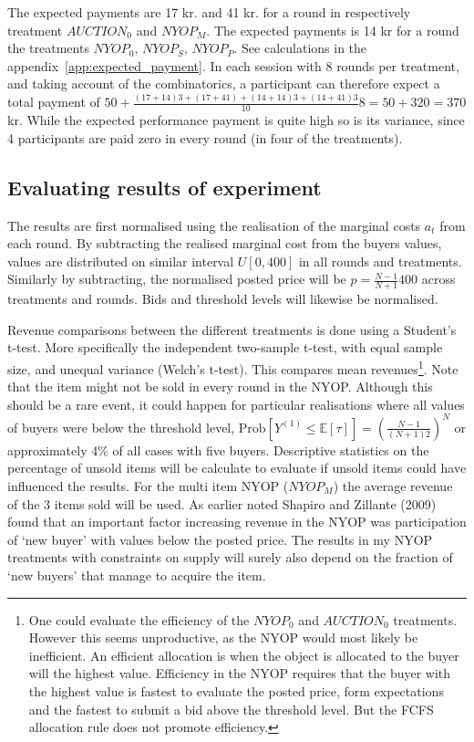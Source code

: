 \documentclass[a4paper,12pt]{article}
\begin{document}
	The expected payments are 17 kr. and 41 kr. for a round in respectively treatment $AUCTION_0$ and $NYOP_M$. The expected payments is 14 kr for a round the treatments $NYOP_0$, $NYOP_S$, $NYOP_P$. See calculations in the appendix~\ref{app:expected_payment}. In each session with 8 rounds per treatment, and taking account of the combinatorics, a participant can therefore expect a total payment of $50 + \frac{(17+14)3 + (17+41) + (14+14)3 + (14+41)3}{10}8 = 50 + 320 = 370$ kr. While the expected performance payment is quite high so is its variance, since 4 participants are paid zero in every round (in four of the treatments).
	
	\subsection{Evaluating results of experiment}
	
	The results are first normalised using the realisation of the marginal costs $a_t$ from each round. By subtracting the realised marginal cost from the buyers values, values are distributed on similar interval $U[0,400]$ in all rounds and treatments. Similarly by subtracting, the normalised posted price will be $p = \frac{N-1}{N+1}400$ across treatments and rounds. Bids and threshold levels will likewise be normalised. 

	Revenue comparisons between the different treatments is done using a Student's t-test. More specifically the independent two-sample t-test, with equal sample size, and unequal variance (Welch's t-test). This compares mean revenues\footnote{\label{footnote:efficient}One could evaluate the efficiency of the $NYOP_0$ and $AUCTION_0$ treatments. However this seems unproductive, as the NYOP would most likely be inefficient. An efficient allocation is when the object is allocated to the buyer will the highest value. Efficiency in the NYOP requires that the buyer with the highest value is fastest to evaluate the posted price, form expectations and the fastest to submit a bid above the threshold level. But the FCFS allocation rule does not promote efficiency.}. Note that the item might not be sold in every round in the NYOP. Although this should be a rare event, it could happen for particular realisations where all values of buyers were below the threshold level, $\mbox{Prob}[Y^{(1)} \le \mathbb{E}[\tau]] = \left(\frac{N-1}{(N+1)2}\right)^N$ or approximately 4\% of all cases with five buyers. Descriptive statistics on the percentage of unsold items will be calculate to evaluate if unsold items could have influenced the results. For the multi item NYOP ($NYOP_M$) the average revenue of the 3 items sold will be used. As earlier noted Shapiro and Zillante (2009) found that an important factor increasing revenue in the NYOP was participation of `new buyer' with values below the posted price. The results in my NYOP treatments with constraints on supply will surely also depend on the fraction of `new buyers' that manage to acquire the item.
\end{document}
